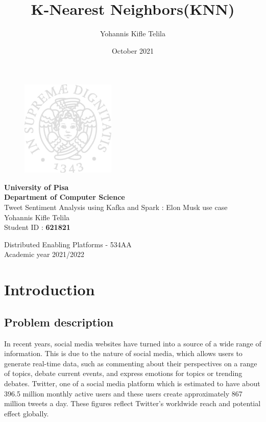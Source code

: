 \documentclass[12pt,a4paper]{report}
\title{K-Nearest Neighbors(KNN)}
\author{Yohannis Kifle Telila}
\date{October 2021}
\begin{document}
\begin{titlepage}
\begin{figure}[t]
    \centering\includegraphics[width=0.4\textwidth]{images/cherubino.eps}
\end{figure}

\begin{center}
    \textbf{University of Pisa\\Department of Computer Science}
    \vspace{15mm}
    \\
    {\huge{Tweet Sentiment Analysis using Kafka and Spark : Elon Musk use case}}\\
    \vspace{5mm}
    \large{Yohannis Kifle Telila} \\
    \vspace{2mm}
    \large{Student ID : \textbf{621821} }
\end{center}

\vspace{20mm}
\begin{center}
    {\large Distributed Enabling Platforms - 534AA\\Academic year 2021/2022}
\end{center}
\vspace{36mm}
\end{titlepage}

\tableofcontents
\pagebreak

\chapter{Introduction}
\section{Problem description}

In recent years, social media websites have turned into a source of a wide range of information. This is due to the nature of social media, which allows users to generate real-time data, such as commenting about their perspectives on a range of topics, debate current events, and express emotions for topics or trending debates. Twitter, one of a social media platform which is estimated to have about 396.5 million monthly active users and these users create approximately 867 million tweets a day\cite{twitterStat}. These figures reflect Twitter's worldwide reach and potential effect globally.
\end{document}
